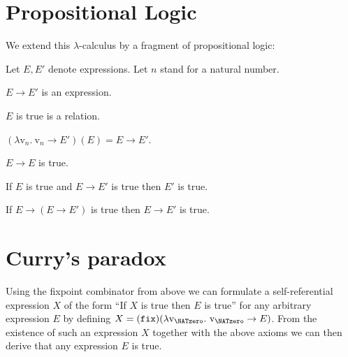 \documentclass[english]{article}
\newcommand{\var}[1]{\textrm{v}_{#1}}
\newcommand{\abs}[2]{\lambda\var{#1}.\ #2}
\newcommand{\app}[2]{(#1)(#2)}
\newcommand{\fix}{\texttt{fix}}
\begin{document}
  \section*{Propositional Logic}

  \noindent We extend this $\lambda$-calculus by a fragment of propositional
  logic:

  \begin{forthel}  
    Let $E, E'$ denote expressions.
    Let $n$ stand for a natural number.

    \begin{signature*}[title=Implication,id=implication]
      $E \rightarrow E'$ is an expression.
    \end{signature*}
  
    \begin{signature*}[title=Truth,id=truth]
      $E$ is true is a relation.
    \end{signature*}
  
    \begin{axiom*}[title=$\beta$-reduction,id=beta_reduction]
      $\app{\abs{n}{\var{n} \rightarrow E'}}{E} = E \rightarrow E'$.
    \end{axiom*}
  
    \begin{axiom*}[title=Reflexivity,id=reflexivity]
      $E \rightarrow E$ is true.
    \end{axiom*}
  
    \begin{axiom*}[title=Modus Ponens,id=modus_ponens]
      If $E$ is true and $E \rightarrow E'$ is true then $E'$ is true.
    \end{axiom*}
  
    \begin{axiom*}[title=Strengthening,id=strengthening]
      If $E \rightarrow (E \rightarrow E')$ is true then $E \rightarrow E'$ is true.
    \end{axiom*}
  \end{forthel}


  \section*{Curry's paradox}

  \noindent Using the fixpoint combinator from above we can formulate a 
  self-referential expression $X$ of the form ``If $X$ is true then $E$ is
  true'' for any arbitrary expression $E$ by defining
  $X = \app{\fix}{\abs{\NATzero}{\var{\NATzero} \rightarrow E}}$.
  From the existence of such an expression $X$ together with the above axioms 
  we can then derive that any expression $E$ is true.
\end{document}
